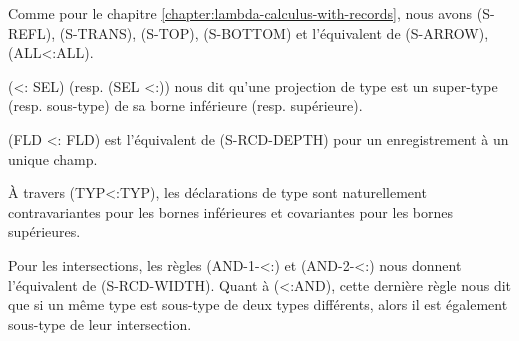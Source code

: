 
Comme pour le chapitre \ref{chapter:lambda-calculus-with-records}, nous
avons (S-REFL), (S-TRANS), (S-TOP), (S-BOTTOM) et l'équivalent de (S-ARROW), (ALL<:ALL).

(<: SEL) (resp. (SEL <:)) nous dit qu'une projection de type est un super-type (resp.
sous-type) de sa borne inférieure (resp. supérieure).

(FLD <: FLD) est l'équivalent de (S-RCD-DEPTH) pour un enregistrement à un
unique champ.

À travers (TYP<:TYP), les déclarations de type sont naturellement contravariantes
pour les bornes inférieures et covariantes pour les bornes supérieures.

Pour les intersections, les règles (AND-1-<:) et (AND-2-<:) nous donnent
l'équivalent de (S-RCD-WIDTH). Quant à (<:AND), cette dernière règle nous dit
que si un même type est sous-type de deux types différents, alors il est
également sous-type de leur intersection.


